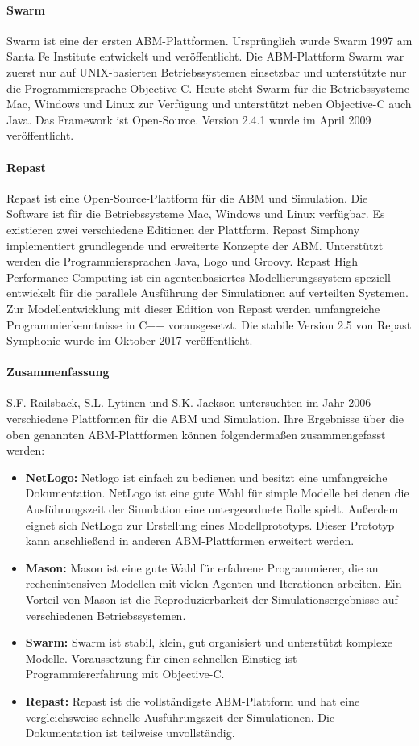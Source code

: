 \documentclass[a4paper, 11pt]{article}
\begin{document}
\paragraph{Swarm}
Swarm ist eine der ersten \acs{ABM}-Plattformen. Ursprünglich wurde Swarm 1997 am Santa Fe Institute entwickelt und veröffentlicht. Die ABM-Plattform Swarm war zuerst nur auf UNIX-basierten Betriebssystemen einsetzbar und unterstützte nur die Programmiersprache Objective-C. Heute steht Swarm für die Betriebssysteme Mac, Windows und Linux zur Verfügung und unterstützt neben Objective-C auch Java. Das Framework ist Open-Source. Version 2.4.1 wurde im April 2009 veröffentlicht.
\paragraph{Repast}
Repast ist eine Open-Source-Plattform für die \acs{ABM} und Simulation. Die Software ist für die Betriebssysteme Mac, Windows und Linux verfügbar. Es existieren zwei verschiedene Editionen der Plattform. Repast Simphony implementiert grundlegende und erweiterte Konzepte der \acs{ABM}. Unterstützt werden die Programmiersprachen Java, Logo und Groovy. Repast High Performance Computing ist ein agentenbasiertes Modellierungssystem speziell entwickelt für die parallele Ausführung der Simulationen auf verteilten Systemen. Zur Modellentwicklung mit dieser Edition von Repast werden umfangreiche Programmierkenntnisse in C++ vorausgesetzt. Die stabile Version 2.5 von Repast Symphonie wurde im Oktober 2017 veröffentlicht. 
\paragraph{Zusammenfassung}
S.F. Railsback, S.L. Lytinen und S.K. Jackson untersuchten im Jahr 2006 verschiedene Plattformen für die \acs{ABM} und Simulation. Ihre Ergebnisse über die oben genannten \acs{ABM}-Plattformen können folgendermaßen zusammengefasst werden:
\begin{itemize}
	\item \textbf{NetLogo:} Netlogo ist einfach zu bedienen und besitzt eine umfangreiche Dokumentation. NetLogo ist eine gute Wahl für simple Modelle bei denen die Ausführungszeit der Simulation eine untergeordnete Rolle spielt. Außerdem eignet sich NetLogo zur Erstellung eines Modellprototyps. Dieser Prototyp kann anschließend in anderen \acs{ABM}-Plattformen erweitert werden.
	\item \textbf{Mason:} Mason ist eine gute Wahl für erfahrene Programmierer, die an rechenintensiven Modellen mit vielen Agenten und Iterationen arbeiten. Ein Vorteil von Mason ist die Reproduzierbarkeit der Simulationsergebnisse auf verschiedenen Betriebssystemen.
	\item \textbf{Swarm:} Swarm ist stabil, klein, gut organisiert und unterstützt komplexe Modelle. Voraussetzung für einen schnellen Einstieg ist Programmiererfahrung mit Objective-C.
	\item \textbf{Repast:} Repast ist die vollständigste \acs{ABM}-Plattform und hat eine vergleichsweise schnelle Ausführungszeit der Simulationen. Die Dokumentation ist teilweise unvollständig.
\end{itemize}
\end{document}
